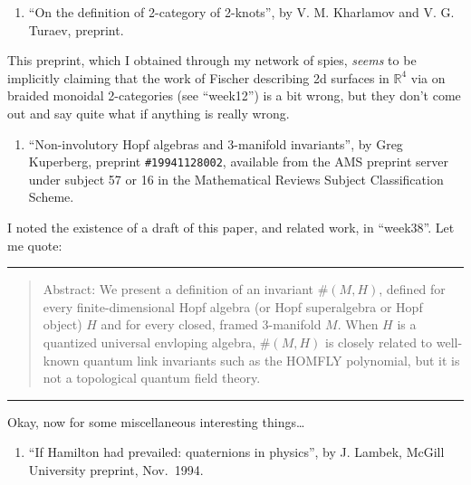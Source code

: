 \documentclass{article}
\def\tightlist{}
\begin{document}
\begin{enumerate}
\def\labelenumi{\arabic{enumi})}
\setcounter{enumi}{8}
\tightlist
\item
  ``On the definition of 2-category of 2-knots'', by V. M. Kharlamov and
  V. G. Turaev, preprint.
\end{enumerate}

This preprint, which I obtained through my network of spies,
\emph{seems} to be implicitly claiming that the work of Fischer
describing 2d surfaces in \(\mathbb{R}^4\) via on braided monoidal
2-categories (see ``week12'') is a bit wrong, but they don't come out
and say quite what if anything is really wrong.

\begin{enumerate}
\def\labelenumi{\arabic{enumi})}
\setcounter{enumi}{9}
\tightlist
\item
  ``Non-involutory Hopf algebras and 3-manifold invariants'', by Greg
  Kuperberg, preprint \texttt{\#19941128002}, available from the AMS
  preprint server under subject 57 or 16 in the Mathematical Reviews
  Subject Classification Scheme.
\end{enumerate}

I noted the existence of a draft of this paper, and related work, in
``week38''. Let me quote:

\begin{center}\rule{0.5\linewidth}{0.5pt}\end{center}

\begin{quote}
Abstract: We present a definition of an invariant \(\#(M,H)\), defined
for every finite-dimensional Hopf algebra (or Hopf superalgebra or Hopf
object) \(H\) and for every closed, framed 3-manifold \(M\). When \(H\)
is a quantized universal envloping algebra, \(\#(M,H)\) is closely
related to well-known quantum link invariants such as the HOMFLY
polynomial, but it is not a topological quantum field theory.
\end{quote}

\begin{center}\rule{0.5\linewidth}{0.5pt}\end{center}

Okay, now for some miscellaneous interesting things\ldots{}

\begin{enumerate}
\def\labelenumi{\arabic{enumi})}
\setcounter{enumi}{10}
\tightlist
\item
  ``If Hamilton had prevailed: quaternions in physics'', by J. Lambek,
  McGill University preprint, Nov.~1994.
\end{enumerate}
\end{document}
